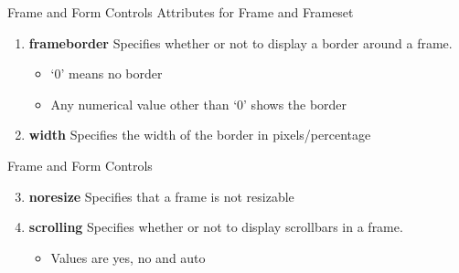 \documentclass[14pt]{beamer}
\begin{document}
\begin{frame}{Frame and Form Controls}
Attributes for Frame and Frameset

\vspace{1pc}
\begin{enumerate}
 \item \textbf{frameborder} Specifies whether or not to display a border around a frame.
 \begin{itemize}
  \item `0' means no border
  \item Any numerical value other than `0' shows the border
 \end{itemize}
\item \textbf{width} Specifies the width of the border in pixels/percentage
\end{enumerate}
\end{frame}

\begin{frame}{Frame and Form Controls}
\begin{enumerate}
\setcounter{enumi}{2}
 \item \textbf{noresize} Specifies that a frame is not resizable
 \item \textbf{scrolling} Specifies whether or not to display scrollbars in a frame.
 \begin{itemize}
  \item Values are yes, no and auto
 \end{itemize}
\end{enumerate}
\end{frame}
\end{document}
